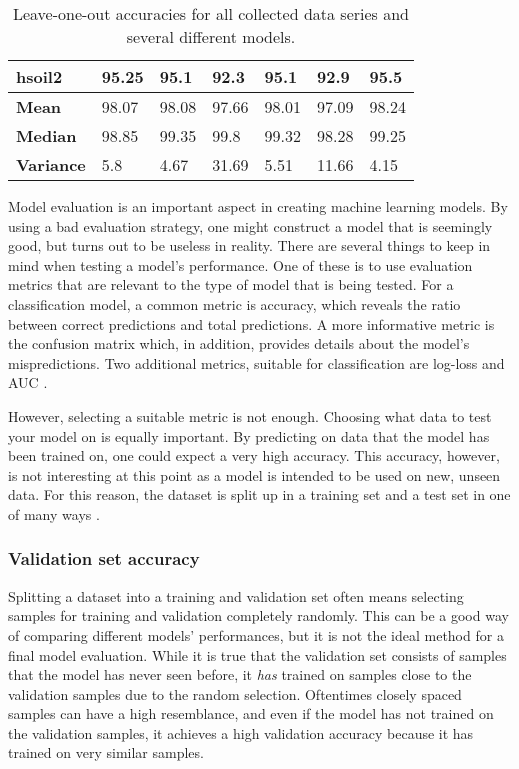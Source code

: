 \begin{table}
\begin{center}
\begin{adjustbox}{totalheight=\baselineskip}
\begin{tabular}{|l|l|l|l|l|l|l|}
		hsoil2 & 95.25 & 95.1 & \cellcolor{red!20}92.3 & 95.1 & \cellcolor{red!20}92.9 & 95.5\\
		\hline
		\textbf{Mean} & 98.07 & 98.08 & 97.66 & 98.01 & 97.09 & \cellcolor{green!20}98.24\\
		\textbf{Median} & 98.85 & 99.35 & \cellcolor{green!20}99.8 & 99.32 & 98.28 & 99.25\\
		\textbf{Variance} & 5.8 & 4.67 & 31.69 & 5.51 & 11.66 & \cellcolor{green!20}4.15\\
		\hline
		\end{tabular}
\end{adjustbox}
	\end{center}
	\label{tab:loo}
	\caption{Leave-one-out accuracies for all collected data series and several different models.}
\end{table}

Model evaluation is an important aspect in creating machine learning models. By using a bad evaluation strategy, one might construct a model that is seemingly good, but turns out to be useless in reality. There are several things to keep in mind when testing a model's performance. One of these is to use evaluation metrics that are relevant to the type of model that is being tested. For a classification model, a common metric is accuracy, which reveals the ratio between correct predictions and total predictions. A more informative metric is the confusion matrix which, in addition, provides details about the model's mispredictions. Two additional metrics, suitable for classification are log-loss and AUC \citep{zheng_2015}. 

However, selecting a suitable metric is not enough. Choosing what data to test your model on is equally important. By predicting on data that the model has been trained on, one could expect a very high accuracy. This accuracy, however, is not interesting at this point as a model is intended to be used on new, unseen data. For this reason, the dataset is split up in a training set and a test set in one of many ways \citep{raschka}.


\subsubsection{Validation set accuracy}
Splitting a dataset into a training and validation set often means selecting samples for training and validation completely randomly. This can be a good way of comparing different models' performances, but it is not the ideal method for a final model evaluation. While it is true that the validation set consists of samples that the model has never seen before, it \textit{has} trained on samples close to the validation samples due to the random selection. Oftentimes closely spaced samples can have a high resemblance, and even if the model has not trained on the validation samples, it achieves a high validation accuracy because it has trained on very similar samples.


